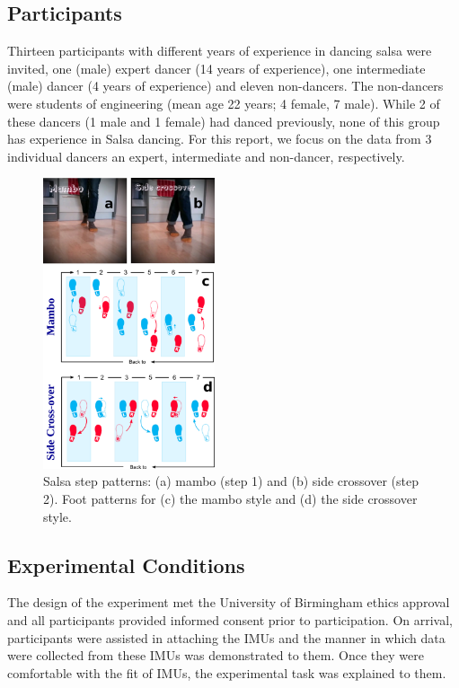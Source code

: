 \documentclass[10pt,journal,compsoc]{IEEEtran}
\begin{document}
\subsection{Participants}
Thirteen participants with different years of experience in
dancing salsa were invited, one (male) expert dancer
(14 years of experience), one intermediate (male) dancer
(4 years of experience) and eleven non-dancers. The
non-dancers were students of engineering (mean age 22 years; 4
female, 7 male). While 2 of these dancers (1 male and 
1 female) had danced previously, none of this group has
experience in Salsa dancing. For this report, we focus on the 
data from 3 individual dancers an expert, intermediate and
non-dancer, respectively.
\begin{figure}[!htb]
\centering    
\includegraphics[width=0.45\textwidth]{steps_v00}
\caption[PA]{Salsa step patterns: (a) mambo (step 1) and (b) side crossover
(step 2). Foot patterns for (c) the mambo style and (d) the side crossover style.}
\label{fig:steps}
\end{figure}

\subsection{Experimental Conditions}
The design of the experiment met the University of Birmingham
ethics approval and all participants provided informed 
consent prior to participation. On arrival, participants were 
assisted in attaching the IMUs and the manner in which 
data were collected from these IMUs was demonstrated to 
them. Once they were comfortable with the fit of IMUs, the 
experimental task was explained to them.
\end{document}
